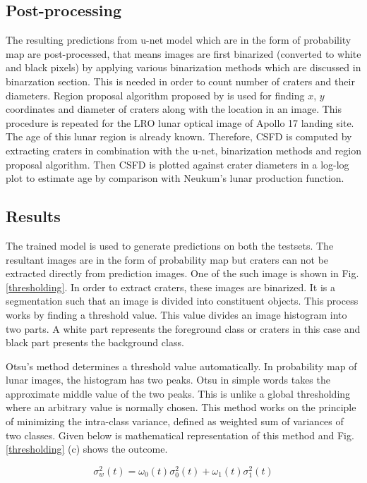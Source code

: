 \documentclass[11pt]{article}
\begin{document}
\subsection{Post-processing}
The resulting predictions from u-net model which are in the form of probability map are post-processed, that means images are first binarized (converted to white and black pixels) by applying various binarization methods which are discussed in binarzation section. This is needed in order to count number of craters and their diameters. Region proposal algorithm proposed by \cite{burger2009principles} is used for finding $x$, $y$ coordinates and diameter of craters along with the location in an image. This procedure is repeated for the LRO lunar optical image of Apollo 17 landing site. The age of this lunar region is already known. Therefore, CSFD is computed by extracting craters in combination with the u-net, binarization methods and region proposal algorithm. Then CSFD is plotted against crater diameters in a log-log plot to estimate age by comparison with Neukum's lunar production function.

\subsection{Results}
The trained model is used to generate predictions on both the testsets. The resultant images are in the form of probability map but craters can not be extracted directly from prediction images. One of the such image is shown in Fig. \ref{thresholding}. In order to extract craters, these images are binarized. It is a segmentation such that an image is divided into constituent objects. This process works by finding a threshold value. This value divides an image histogram into two parts. A white part represents the foreground class or craters in this case and black part presents the background class.

Otsu's method determines a threshold value automatically. In probability map of lunar images, the histogram has two peaks. Otsu in simple words takes the approximate middle value of the two peaks. This is unlike a global thresholding where an arbitrary value is normally chosen. This method works on the principle of minimizing the intra-class variance, defined as weighted sum of variances of two classes. Given below is mathematical representation of this method and Fig. \ref{thresholding} (c) shows the outcome.

\begin{equation}
\sigma_{w}^{2}(t)=\omega_{0}(t) \sigma_{0}^{2}(t)+\omega_{1}(t) \sigma_{1}^{2}(t)
\end{equation}
\end{document}
